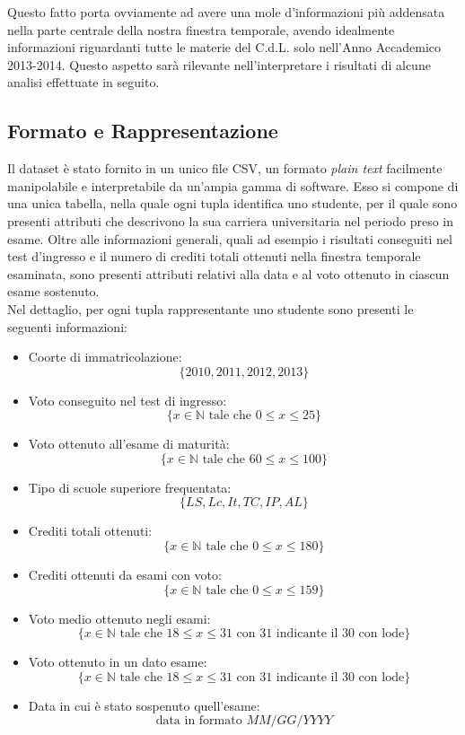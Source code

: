 Questo fatto porta ovviamente ad avere una mole d'informazioni più addensata nella parte centrale della nostra finestra temporale, avendo idealmente informazioni riguardanti tutte le materie del C.d.L. solo nell'Anno Accademico 2013-2014. Questo aspetto sarà rilevante nell'interpretare i risultati di alcune analisi effettuate in seguito.

\subsection{Formato e Rappresentazione}

Il dataset è stato fornito in un unico file CSV, un formato \textit{plain text} facilmente manipolabile e interpretabile da un'ampia gamma di software. Esso si compone di una unica tabella, nella quale ogni tupla identifica uno studente, per il quale sono presenti attributi che descrivono la sua carriera universitaria nel periodo preso in esame. Oltre alle informazioni generali, quali ad esempio i risultati conseguiti nel test d'ingresso e il numero di crediti totali ottenuti nella finestra temporale esaminata, sono presenti attributi relativi alla data e al voto ottenuto in ciascun esame sostenuto. \\

Nel dettaglio, per ogni tupla rappresentante uno studente sono presenti le seguenti informazioni:

\begin{itemize}
	\item Coorte di immatricolazione: $$ \{2010, 2011, 2012, 2013\} $$
	\item Voto conseguito nel test di ingresso: $$ \{ x \in \mathbb{N} \text{ tale che } 0 \leq x \leq 25\} $$
	\item Voto ottenuto all'esame di maturità: $$ \{ x \in \mathbb{N} \text{ tale che } 60 \leq x \leq 100\} $$
	\item Tipo di scuole superiore frequentata: $$ \{LS, Lc, It, TC, IP, AL \} $$
	\item Crediti totali ottenuti: $$ \{ x \in \mathbb{N} \text{ tale che } 0 \leq x \leq 180\} $$
	\item Crediti ottenuti da esami con voto: $$ \{ x \in \mathbb{N} \text{ tale che } 0 \leq x \leq 159\} $$
	\item Voto medio ottenuto negli esami: $$ \{ x \in \mathbb{N} \text{ tale che } 18 \leq x \leq 31 \text { con 31 indicante il 30 con lode}\} $$
	\item Voto ottenuto in un dato esame: $$ \{ x \in \mathbb{N} \text{ tale che } 18 \leq x \leq 31 \text { con 31 indicante il 30 con lode}\} $$
	\item Data in cui è stato sospenuto quell'esame: $$ \text{data in formato }MM/GG/YYYY $$
\end{itemize}

